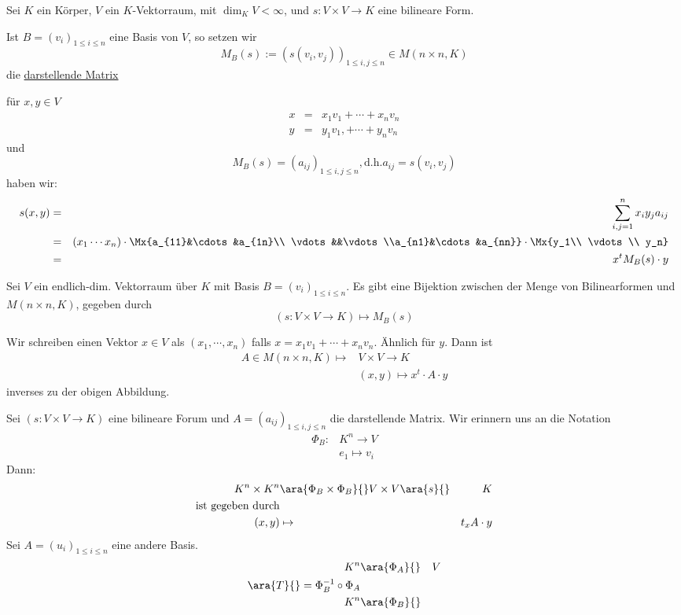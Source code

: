 Sei $K$ ein Körper, $V$ ein $K$-Vektorraum, mit $\dim_KV<\infty$, und $s:V\times V\to K$ eine bilineare Form.
\begin{Def}
  Ist $B=(v_i)_{1\leq i \leq n}$ eine Basis von $V$, so setzen wir 
  \[M_B(s):=\left( s(v_i,v_j) \right)_{1\leq i, j\leq n} \in M(n\times n,K)\]
  die \underline{darstellende Matrix}
\end{Def}
\begin{Kor}
  für $x,y\in V$
  \begin{align*}
    x&=& x_1v_1+\cdots+x_nv_n\\
    y&=& y_1v_1,+\cdots+y_nv_n
  \end{align*}
  und
  \[M_B(s)=(a_{ij})_{1\leq i, j\leq n}, \text{d.h.} a_{ij}=s(v_i,v_j)\]
  haben wir:
  \begin{align*}
    s(x,y)&=& \sum^n_{i,j=1}x_iy_ja_{ij}\\
    &=& (x_1\cdots x_n)\cdot\Mx{a_{11}&\cdots&a_{1n}\\ \vdots&&\vdots\\a_{n1}&\cdots&a_{nn}}\cdot \Mx{y_1\\ \vdots\\ y_n}\\
    &=& x^tM_B(s)\cdot y
  \end{align*}
\end{Kor}
\begin{Prop}
  Sei $V$ ein endlich-dim. Vektorraum über $K$ mit Basis $B=(v_i)_{1\leq i \leq n}$. Es gibt eine Bijektion zwischen der Menge von Bilinearformen und $M(n\times n,K)$, gegeben durch
  \[\left( s:V\times V\to K \right)\mapsto M_B(s)\]
\end{Prop}
\begin{Bew}
  Wir schreiben einen Vektor $x\in V$ als $(x_1,\cdots,x_n)$ falls $x=x_1v_1+\cdots+x_nv_n$. Ähnlich für $y$. Dann ist
  \begin{align*}
   A\in M(n\times n,K)\mapsto & V\times V \to K\\
   & (x,y)\mapsto x^t\cdot A \cdot y
  \end{align*}
  inverses zu der obigen Abbildung.
\end{Bew}
\begin{Bem}
  Sei $\left( s:V\times V\to K \right)$ eine bilineare Forum und $A=(a_{ij})_{1\leq i,j\leq n}$ die darstellende Matrix. Wir erinnern uns an die Notation
  \begin{align*}
    \Phi_B:&K^n\to V\\
    &e_1 \mapsto v_i
  \end{align*}
  Dann:
  \begin{align*}
    K^n\times K^n&\ara{\Phi_B\times\Phi_B}{}V\times V\ara{s}{}&K\\
    \text{ist gegeben durch}\\
    (x,y)&\mapsto&t_xA\cdot y
  \end{align*}
  Sei $A=(u_i)_{1\leq i\leq n}$ eine andere Basis.  
  \begin{align*}
    K^n&\ara{\Phi_A}{}&V\\
    \ara{T}{}=\Phi^{-1}_B\circ \Phi_A&\\
    K^n&\ara{\Phi_B}{}&
  \end{align*}
\end{Bem}
